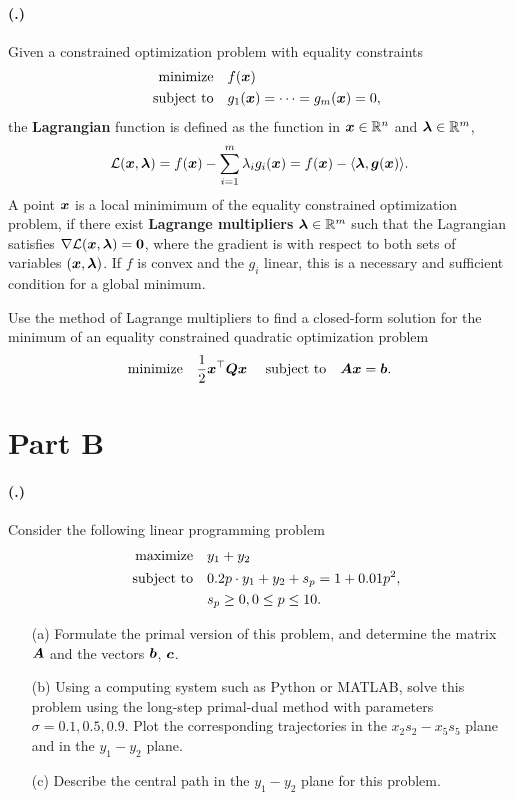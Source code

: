 \documentclass{article}
\newcounter{problemSheetNumber}
\newcounter{problems}
\renewcommand{\problem}{\paragraph{(\theproblemSheetNumber.\theproblems)}\addtocounter{problems}{1}}
\begin{document}
\problem Given a constrained optimization problem with equality constraints
\begin{align*}
  \text{minimize}\quad & f(\bm{x})\\
  \quad\text{subject to}\quad & g_1(\bm{x}) = \cdots = g_m(\bm{x}) = 0,
\end{align*}
the \textbf{Lagrangian} function is defined as the function in $\bm{x}\in \mathbb{R}^n$ and $\bm{\lambda}\in \mathbb{R}^m$,
\begin{equation*}
  \mathcal{L}(\bm{x},\bm{\lambda}) = f(\bm{x})-\sum_{i=1}^m \lambda_i g_i(\bm{x}) = f(\bm{x})-\langle {\bm{\lambda}}, {\bm{g}(\bm{x})} \rangle.
\end{equation*}
A point $\bm{x}$ is a local minimimum of the equality constrained optimization problem, if there exist \textbf{Lagrange multipliers} $\bm{\lambda}\in \mathbb{R}^m$ such that the Lagrangian satisfies $\nabla \mathcal{L}(\bm{x},\bm{\lambda})=\bm{0}$, where the gradient is with respect to both sets of variables $(\bm{x},\bm{\lambda})$. If $f$ is convex and the $g_i$ linear, this is a necessary and sufficient condition for a global minimum.

Use the method of Lagrange multipliers to find a closed-form solution for the minimum of an equality constrained quadratic optimization problem
\begin{equation*}
\text{minimize}\quad \frac{1}{2}\bm{x}^{\top}\bm{Q}\bm{x} \ \quad\text{subject to}\quad \bm{A}\bm{x}=\bm{b}.
\end{equation*}



\section*{Part B}

\problem Consider the following linear programming problem
\begin{align*}
 \text{maximize}\quad & y_1+y_2\\
 \quad\text{subject to}\quad & 0.2p\cdot y_1+y_2+s_p=1+0.01p^2,\\
 & s_p\geq 0, 0\leq p\leq 10.
\end{align*}
\begin{itemize}
 \item[(a)] Formulate the primal version of this problem, and determine the matrix $\bm{A}$ and the vectors $\bm{b}$, $\bm{c}$.
 \item[(b)] Using a computing system such as Python or MATLAB, solve this problem using the long-step primal-dual method with parameters $\sigma=0.1, 0.5, 0.9$. Plot the corresponding trajectories in the $x_2s_2-x_5s_5$ plane and in the $y_1-y_2$ plane. 
 \item[(c)] Describe the central path in the $y_1-y_2$ plane for this problem.
\end{itemize}
\end{document}
